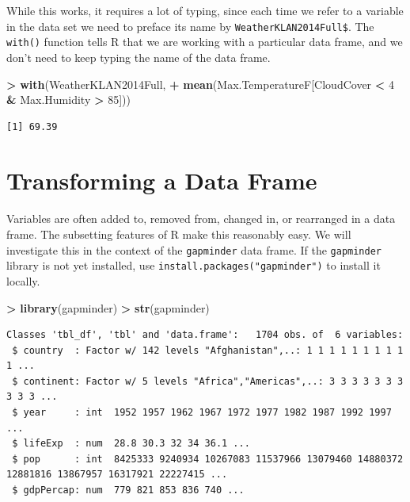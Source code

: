 \documentclass[
]{krantz}
\makeatletter
\newenvironment{Shaded}{\begin{snugshade}}{\end{snugshade}}
\newcommand{\DecValTok}[1]{\textcolor[rgb]{0.06,0.06,0.06}{#1}}
\newcommand{\KeywordTok}[1]{\textcolor[rgb]{0.27,0.27,0.27}{\textbf{#1}}}
\newcommand{\NormalTok}[1]{#1}
\newcommand{\OperatorTok}[1]{\textcolor[rgb]{0.43,0.43,0.43}{\textbf{#1}}}
\newcommand{\StringTok}[1]{\textcolor[rgb]{0.5,0.5,0.5}{#1}}
\newenvironment{kframe}{%
\medskip{}
\setlength{\fboxsep}{.8em}
 \def\at@end@of@kframe{}%
 \ifinner\ifhmode%
  \def\at@end@of@kframe{\end{minipage}}%
  \begin{minipage}{\columnwidth}%
 \fi\fi%
 \def\FrameCommand##1{\hskip\@totalleftmargin \hskip-\fboxsep
 \colorbox{shadecolor}{##1}\hskip-\fboxsep
     \hskip-\linewidth \hskip-\@totalleftmargin \hskip\columnwidth}%
 \MakeFramed {\advance\hsize-\width
   \@totalleftmargin\z@ \linewidth\hsize
   \@setminipage}}%
 {\par\unskip\endMakeFramed%
 \at@end@of@kframe}
\renewenvironment{Shaded}{\begin{kframe}}{\end{kframe}}
\makeatother
\begin{document}
While this works, it requires a lot of typing, since each time we refer to a variable in the data set we need to preface its name by \texttt{WeatherKLAN2014Full\$}. The \texttt{with()} function tells R that we are working with a particular data frame, and we don't need to keep typing the name of the data frame.

\begin{Shaded}
\begin{Highlighting}[]
\OperatorTok{\textgreater{}}\StringTok{ }\KeywordTok{with}\NormalTok{(WeatherKLAN2014Full, }
\OperatorTok{+}\StringTok{      }\KeywordTok{mean}\NormalTok{(Max.TemperatureF[CloudCover }\OperatorTok{\textless{}}\StringTok{ }\DecValTok{4} \OperatorTok{\&}\StringTok{ }\NormalTok{Max.Humidity }\OperatorTok{\textgreater{}}\StringTok{ }\DecValTok{85}\NormalTok{]))}
\end{Highlighting}
\end{Shaded}

\begin{verbatim}
[1] 69.39
\end{verbatim}

\hypertarget{transforming-a-data-frame}{%
\section{Transforming a Data Frame}\label{transforming-a-data-frame}}

Variables are often added to, removed from, changed in, or rearranged in a data frame. The subsetting features of R make this reasonably easy. We will investigate this in the context of the \texttt{gapminder} data frame. If the \texttt{gapminder} library is not yet installed, use \texttt{install.packages("gapminder")} to install it locally.

\begin{Shaded}
\begin{Highlighting}[]
\OperatorTok{\textgreater{}}\StringTok{ }\KeywordTok{library}\NormalTok{(gapminder)}
\OperatorTok{\textgreater{}}\StringTok{ }\KeywordTok{str}\NormalTok{(gapminder)}
\end{Highlighting}
\end{Shaded}

\begin{verbatim}
Classes 'tbl_df', 'tbl' and 'data.frame':   1704 obs. of  6 variables:
 $ country  : Factor w/ 142 levels "Afghanistan",..: 1 1 1 1 1 1 1 1 1 1 ...
 $ continent: Factor w/ 5 levels "Africa","Americas",..: 3 3 3 3 3 3 3 3 3 3 ...
 $ year     : int  1952 1957 1962 1967 1972 1977 1982 1987 1992 1997 ...
 $ lifeExp  : num  28.8 30.3 32 34 36.1 ...
 $ pop      : int  8425333 9240934 10267083 11537966 13079460 14880372 12881816 13867957 16317921 22227415 ...
 $ gdpPercap: num  779 821 853 836 740 ...
\end{verbatim}
\end{document}
